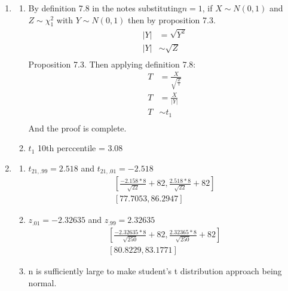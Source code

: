 \documentclass{article}
\begin{document}

\begin{enumerate}
\item
	\begin{enumerate}
	\item
	By definition 7.8 in the notes substituting$n=1$, if $X\sim N(0,1)$ and $Z\sim \chi^{2}_{1}$  with $Y \sim N(0,1)$ then by proposition 7.3.
	\begin{equation*}
	\begin{split}
	|Y| &= \sqrt{Y^{2}} \\
	|Y| &\sim \sqrt{Z} \\
	\end{split}
	\end{equation*}
	Proposition 7.3. Then applying definition 7.8:
	\begin{equation*}
	\begin{split}
	T & = \frac{X}{\sqrt{\frac{Z}{1}}} \\
	T & = \frac{X}{|Y|} \\
	T &\sim t_{1} \\
	\end{split}
	\end{equation*}
	And the proof is complete. 
	\item
	$t_{1}$ 10th perccentile = 3.08
	\end{enumerate}
\item
	\begin{enumerate}
	\item
	$t_{21,.99} = 2.518$ and $t_{21,.01} = -2.518$
	\begin{equation*}
	\begin{split}
	[\frac{-2.158*8}{\sqrt{22}} + 82, \frac{2.518*8}{\sqrt{22}}+82]\\
	[77.7053, 86.2947]
	\end{split}
	\end{equation*}
	\item
	$z_{.01} = -2.32635$ and $z_{.99} = 2.32635$ 
	\begin{equation*}
	\begin{split}
	[\frac{-2.32635*8}{\sqrt{250}} + 82, \frac{2.32365*8}{\sqrt{250}}+82]\\
	[80.8229,83.1771]
	\end{split}
	\end{equation*}
	\item
n is sufficiently large to make student's t distribution approach being normal.
	\end{enumerate}

\end{enumerate}
\end{document}
